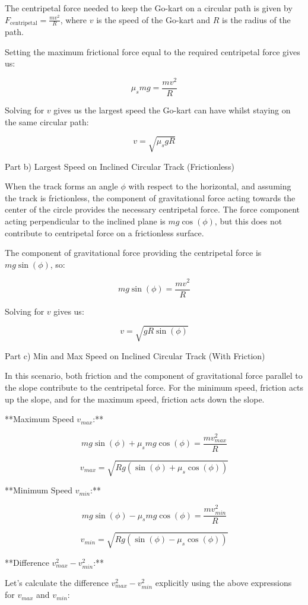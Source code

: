 The centripetal force needed to keep the Go-kart on a circular path is given by \( F_{\text{centripetal}} = \frac{mv^2}{R} \), where \( v \) is the speed of the Go-kart and \( R \) is the radius of the path.

Setting the maximum frictional force equal to the required centripetal force gives us:

\[ \mu_s mg = \frac{mv^2}{R} \]

Solving for \( v \) gives us the largest speed the Go-kart can have whilst staying on the same circular path:

\[ v = \sqrt{\mu_s g R} \]

Part b) Largest Speed on Inclined Circular Track (Frictionless)

When the track forms an angle \( \phi \) with respect to the horizontal, and assuming the track is frictionless, the component of gravitational force acting towards the center of the circle provides the necessary centripetal force. The force component acting perpendicular to the inclined plane is \( mg\cos(\phi) \), but this does not contribute to centripetal force on a frictionless surface.

The component of gravitational force providing the centripetal force is \( mg\sin(\phi) \), so:

\[ mg\sin(\phi) = \frac{mv^2}{R} \]

Solving for \( v \) gives us:

\[ v = \sqrt{gR\sin(\phi)} \]

Part c) Min and Max Speed on Inclined Circular Track (With Friction)

In this scenario, both friction and the component of gravitational force parallel to the slope contribute to the centripetal force. For the minimum speed, friction acts up the slope, and for the maximum speed, friction acts down the slope.

**Maximum Speed \( v_{max} \):**

\[ mg\sin(\phi) + \mu_s mg\cos(\phi) = \frac{mv_{max}^2}{R} \]

\[ v_{max} = \sqrt{Rg(\sin(\phi) + \mu_s\cos(\phi))} \]

**Minimum Speed \( v_{min} \):**

\[ mg\sin(\phi) - \mu_s mg\cos(\phi) = \frac{mv_{min}^2}{R} \]

\[ v_{min} = \sqrt{Rg(\sin(\phi) - \mu_s\cos(\phi))} \]

**Difference \( v_{max}^2 - v_{min}^2 \):**

Let's calculate the difference \( v_{max}^2 - v_{min}^2 \) explicitly using the above expressions for \( v_{max} \) and \( v_{min} \):

